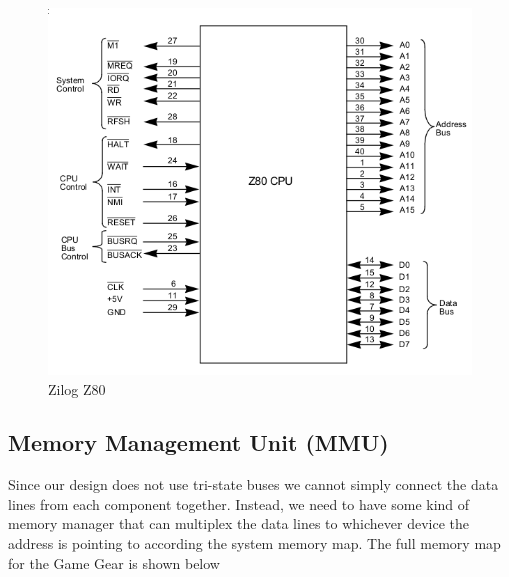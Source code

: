 \documentclass{article}
\begin{document}
\begin{figure}[H]
\centering
\includegraphics[scale=0.4]{../images/z80.png}
\caption{Zilog Z80}
\label{fig:z80}
\end{figure}

\subsection{Memory Management Unit (MMU)}
Since our design does not use tri-state buses we cannot simply connect the data
lines from each component together. Instead, we need to have some kind of
memory manager that can multiplex the data lines to whichever device the
address is pointing to according the system memory map. The full memory map for
the Game Gear is shown below
\end{document}
